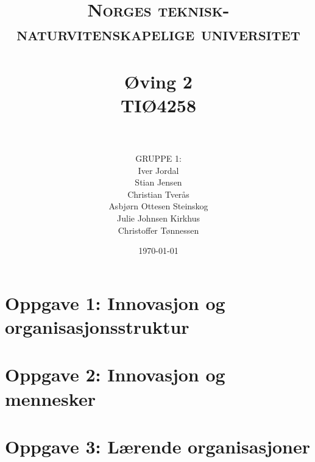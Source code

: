 \documentclass[paper=a4, fontsize=11pt]{scrartcl} %
\title{ 
\normalfont \normalsize 
\textsc{Norges teknisk-naturvitenskapelige universitet} \\ [25pt] %
\horrule{0.5pt} \\[0.4cm] %
\huge \textbf{Øving 2} \\ %
TIØ4258 \\
\horrule{2pt} \\[0.5cm] %
}
\author{GRUPPE 1:\\Iver Jordal\\Stian Jensen\\Christian Tverås\\Asbjørn Ottesen Steinskog\\Julie Johnsen Kirkhus\\Christoffer Tønnessen}
\date{\normalsize \today}
\numberwithin{equation}{section} %
\numberwithin{figure}{section} %
\numberwithin{table}{section} %
\begin{document}
\maketitle

\thispagestyle{firststyle}

\setcounter{secnumdepth}{3}


\section{Oppgave 1: Innovasjon og organisasjonsstruktur}


\section{Oppgave 2: Innovasjon og mennesker}


\section{Oppgave 3: Lærende organisasjoner}

\end{document}
